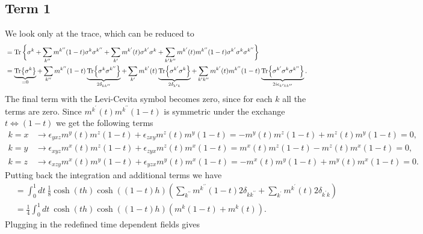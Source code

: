 \subsection*{Term 1}
We look only at the trace, which can be reduced to
\begin{align*}
    &= \Tr\bigg\{ \sigma^k + 
    \sum_{k^{\prime\prime}} m^{k^{\prime\prime}}(1-t) \sigma^k\sigma^{k^{\prime\prime}} +
    \sum_{k^{\prime}} m^{k^{\prime}}(t) \sigma^{k^{\prime}} \sigma^k + \sum_{k^{\prime}k^{\prime\prime}} m^{k^{\prime}}(t) m^{k^{\prime\prime}}(1-t)\sigma^{k^{\prime}} \sigma^k\sigma^{k^{\prime\prime}}\bigg\}\\
    &= \underbrace{\Tr{ \sigma^k }}_{=0}+ 
    \sum_{k^{\prime\prime}} m^{k^{\prime\prime}}(1-t) \underbrace{\Tr{ \sigma^k\sigma^{k^{\prime\prime}}}}_{2\delta_{kk^{\prime\prime}}} +
    \sum_{k^{\prime}} m^{k^{\prime}}(t) \underbrace{\Tr{\sigma^{k^{\prime}} \sigma^k}}_{2\delta_{k^\prime k}} + 
    \sum_{k^{\prime}k^{\prime\prime}} m^{k^{\prime}}(t) m^{k^{\prime\prime}}(1-t) \underbrace{\Tr{\sigma^{k^{\prime}} \sigma^k\sigma^{k^{\prime\prime}}}}_{2i\epsilon_{k^{\prime}kk^{\prime\prime}}}.
\end{align*}
The final term with the Levi-Cevita symbol becomes zero, since for each $k$ all the terms are zero. Since $m^{k^{\prime}}(t) m^{k^{\prime\prime}}(1-t)$ is symmetric under the exchange $t \Leftrightarrow (1 - t)$ we get the following terms
\begin{align*}
    k=x &\rightarrow \epsilon_{yxz} m^{y}(t) m^{z}(1-t) + \epsilon_{zxy} m^{z}(t) m^{y}(1-t)= -m^{y}(t) m^{z}(1-t) + m^{z}(t) m^{y}(1-t) = 0,\\
    k=y &\rightarrow \epsilon_{xyz} m^{x}(t) m^{z}(1-t) + \epsilon_{zyx} m^{z}(t) m^{x}(1-t) = m^{x}(t) m^{z}(1-t) - m^{z}(t) m^{x}(1-t) = 0,\\
    k=z &\rightarrow \epsilon_{xzy} m^{x}(t) m^{y}(1-t) + \epsilon_{yzx} m^{y}(t) m^{x}(1-t) = -m^{x}(t) m^{y}(1-t) + m^{y}(t) m^{x}(1-t) = 0.
\end{align*}
Putting back the integration and additional terms we have
\begin{align*}
    &=\int_{0}^1 dt\: \frac{1}{8}\cosh(th)\cosh((1-t)h)\left( \sum_{k^{\prime\prime}} m^{k^{\prime\prime}}(1-t) 2\delta_{kk^{\prime\prime}} + \sum_{k^{\prime}} m^{k^{\prime}}(t) 2\delta_{k^\prime k} \right)\\
    &= \frac{1}{4}\int_{0}^1 dt\:\cosh(th)\cosh((1-t)h) ( m^{k}(1-t) + m^{k}(t)).
\end{align*}
Plugging in the redefined time dependent fields gives
